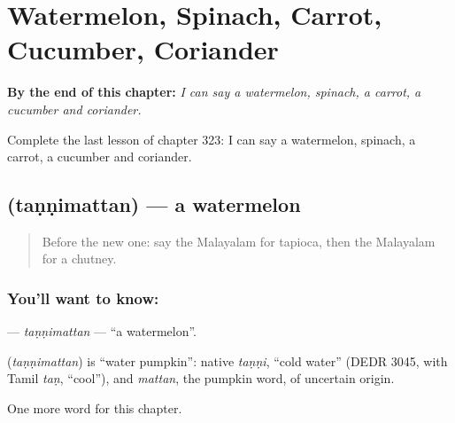 
\chapter{Watermelon, Spinach, Carrot, Cucumber, Coriander}
\label{ch:ml-watermelon-spinach-carrot-cucumber-coriander}

\begin{chapteropening}
\textbf{By the end of this chapter:} \emph{I can say a watermelon, spinach, a carrot, a cucumber and coriander.}

Complete the last lesson of chapter 323: I can say a watermelon, spinach, a carrot, a cucumber and coriander.
\end{chapteropening}

\section[\texorpdfstring{\ml{തണ്ണിമത്തൻ} (taṇṇimattan)}{തണ്ണിമത്തൻ (taṇṇimattan)}]{ (taṇṇimattan) — a watermelon}

\label{lesson:ML-C323-tannimattan}



\begin{quote}
Before the new one: say the Malayalam for tapioca, then the Malayalam for a chutney.
\end{quote}

\subsection*{You'll want to know: }
\textbf{} — \emph{taṇṇimattan} — \textquotedblleft{}a watermelon\textquotedblright{}.

\begin{cousinweb}
\textbf{} (\emph{taṇṇimattan}) is \textquotedblleft{}water pumpkin\textquotedblright{}: native \emph{taṇṇi}, \textquotedblleft{}cold water\textquotedblright{} (DEDR 3045, with Tamil \emph{taṇ}, \textquotedblleft{}cool\textquotedblright{}), and \emph{mattan}, the pumpkin word, of uncertain origin.
\end{cousinweb}

\begin{grammarlens}[title={What you've built}]
One more word for this chapter.
\end{grammarlens}


